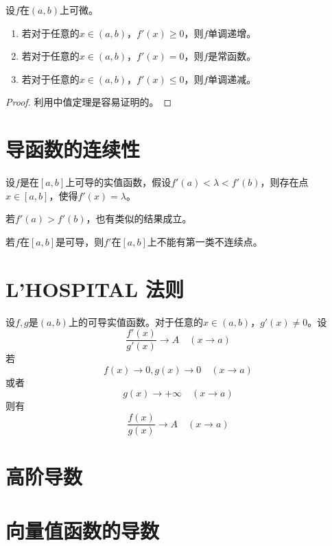\documentclass{article}
\newcommand{\ra}{\rightarrow}
\begin{document}
\begin{theorem}
    设\(f\)在\((a,b)\)上可微。\begin{enumerate}[label=(\alph*)]
        \item 若对于任意的\(x\in(a,b)\)，\(f'(x)\geq0\)，则\(f\)单调递增。
        \item 若对于任意的\(x\in(a,b)\)，\(f'(x)=0\)，则\(f\)是常函数。
        \item 若对于任意的\(x\in(a,b)\)，\(f'(x)\leq0\)，则\(f\)单调递减。
    \end{enumerate}
\end{theorem}
\begin{proof}
    利用中值定理是容易证明的。
\end{proof}


\section{导函数的连续性}

\begin{theorem}
    设\(f\)是在\([a,b]\)上可导的实值函数，假设\(f'(a)<\lambda <f'(b)\)，则存在点\(x\in[a,b]\)，使得\(f'(x)=\lambda\)。\par
    若\(f'(a)>f'(b)\)，也有类似的结果成立。
\end{theorem}

\begin{corollary}
    若\(f\)在\([a,b]\)是可导，则\(f'\)在\([a,b]\)上不能有第一类不连续点。
\end{corollary}

\section{L'HOSPITAL 法则}

\begin{theorem}
    设\(f,g\)是\((a,b)\)上的可导实值函数。对于任意的\(x\in(a,b)\)，\(g'(x)\neq 0\)。设\[
    \frac{f'(x)}{g'(x)}\ra A\quad(x\ra a)
    \]
    若\[
    f(x)\ra 0,g(x)\ra 0\quad(x\ra a)
    \]或者
    \[g(x) \ra +\infty \quad(x\ra a) \]
    则有\[
    \frac{f(x)}{g(x)}\ra A\quad(x\ra a)
    \]
\end{theorem}

\section{高阶导数}
\section{向量值函数的导数}
\end{document}
